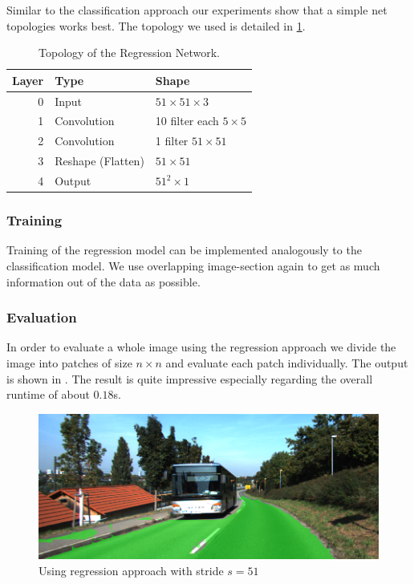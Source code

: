 Similar to the classification approach our experiments show that a simple net topologies works best. The topology we used is detailed in \cref{tab:topo2}.

\begin{table}[H]
	\normalsize
	\centering
	\begin{tabular}{r l l}
		\toprule
		\textbf{Layer} & \textbf{Type}  & \textbf{Shape}  \\
		\midrule
		0     & Input &  $51 \times 51 \times 3$ \\
		1     & Convolution & 10 filter  each $5 \times 5$ \\
		2     & Convolution & 1 filter $51 \times 51$  \\
		3     & Reshape (Flatten) & $51 \times 51$ \\
		4     & Output     & $51^2 \times 1$ \\
		\bottomrule
	\end{tabular}
	\caption{Topology of the Regression Network.}
	\label{tab:topo2}
\end{table}

\subsubsection{Training}

Training of the regression model can be implemented analogously to the classification model. We use overlapping image-section again to get as much information out of the data as possible.

\subsubsection{Evaluation}

In order to evaluate a whole image using the regression approach we divide the image into patches of size $n \times n$ and evaluate each patch individually. The output is shown in . The result is quite impressive especially regarding the overall runtime of about $0.18$s.

\begin{figure}[]
	\centering
	\includegraphics[width=\columnwidth]{figures/models/testing2-um_32_conv_stride51.png}
	\caption{Using regression approach with stride $s=51$}
	\label{fig:reg_stride2}
\end{figure}


